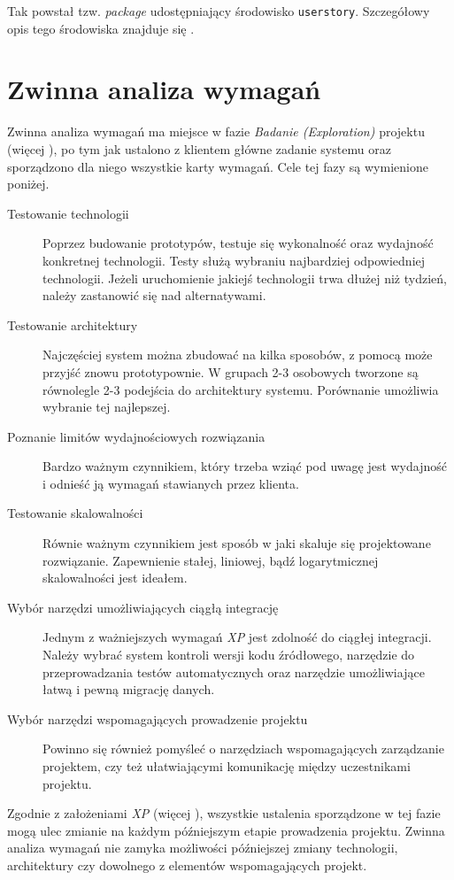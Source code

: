 Tak powstał tzw. \textit{package} udostępniający środowisko \texttt{userstory}. Szczegółowy opis tego środowiska znajduje się .

\section{Zwinna analiza wymagań}
\label{sec:ZMTOzwinnaAnalizaWymagan}

Zwinna analiza wymagań ma miejsce w fazie \textit{Badanie (Exploration)} projektu (więcej ), po tym jak ustalono z klientem główne zadanie systemu oraz sporządzono dla niego wszystkie karty wymagań. Cele tej fazy są wymienione poniżej.

\begin{description}
    \item[Testowanie technologii]{Poprzez budowanie prototypów, testuje się wykonalność oraz wydajność konkretnej technologii. Testy służą wybraniu najbardziej odpowiedniej technologii. Jeżeli uruchomienie jakiejś technologii trwa dłużej niż tydzień, należy zastanowić się nad alternatywami.}
    \item[Testowanie architektury]{Najczęściej system można zbudować na kilka sposobów, z pomocą może przyjść znowu prototypownie. W grupach 2-3 osobowych tworzone są równolegle 2-3 podejścia do architektury systemu. Porównanie umożliwia wybranie tej najlepszej.}
    \item[Poznanie limitów wydajnościowych rozwiązania]{Bardzo ważnym czynnikiem, który trzeba wziąć pod uwagę jest wydajność i odnieść ją wymagań stawianych przez klienta.}
    \item[Testowanie skalowalności]{Równie ważnym czynnikiem jest sposób w jaki skaluje się projektowane rozwiązanie. Zapewnienie stałej, liniowej, bądź logarytmicznej skalowalności jest ideałem.}
    \item[Wybór narzędzi umożliwiających ciągłą integrację]{Jednym z ważniejszych wymagań \textit{XP} jest zdolność do ciągłej integracji. Należy wybrać system kontroli wersji kodu źródłowego, narzędzie do przeprowadzania testów automatycznych oraz narzędzie umożliwiające łatwą i pewną migrację danych.}
    \item[Wybór narzędzi wspomagających prowadzenie projektu]{Powinno się również pomyśleć o narzędziach wspomagających zarządzanie projektem, czy też ułatwiającymi komunikację między uczestnikami projektu.}
\end{description}

Zgodnie z założeniami \textit{XP} (więcej ), wszystkie ustalenia sporządzone w tej fazie mogą ulec zmianie na każdym późniejszym etapie prowadzenia projektu. Zwinna analiza wymagań nie zamyka możliwości późniejszej zmiany technologii, architektury czy dowolnego z elementów wspomagających projekt.

\newpage
